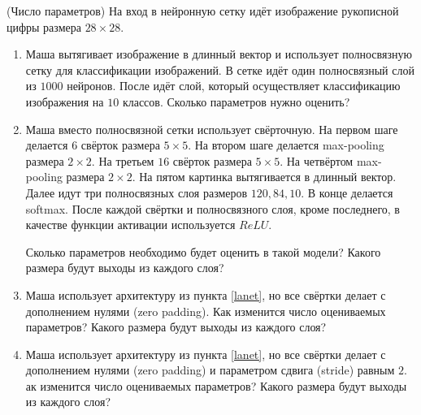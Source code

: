 \begin{problem}{(Число параметров)}
На вход в нейронную сетку идёт изображение рукописной цифры размера $28 \times 28$.
\begin{enumerate}
    \item Маша вытягивает изображение в длинный вектор и использует полносвязную сетку для классификации изображений. В сетке идёт один полносвязный слой из $1000$ нейронов. После идёт слой, который осуществляет классификацию изображения на $10$ классов. Сколько параметров нужно оценить?
    
    \item \label{lanet} Маша вместо полносвязной сетки использует свёрточную. На первом шаге делается $6$ свёрток размера $5 \times 5$. На втором шаге делается max-pooling размера $2 \times 2$. На третьем $16$ свёрток размера $5\times 5$. На четвёртом max-pooling размера $2 \times 2$. На пятом картинка вытягивается в длинный вектор. Далее идут три полносвязных слоя размеров $120, 84, 10$. В конце делается softmax. После каждой свёртки и полносвязного слоя, кроме последнего, в качестве функции активации используется $ReLU.$ 
    
    \begin{center}    
    \end{center} 
    
    Сколько параметров необходимо будет оценить в такой модели? Какого размера будут выходы из каждого слоя? 
    
    \item Маша использует архитектуру из пункта \ref{lanet}, но все свёртки делает с дополнением нулями (zero padding). Как изменится число оцениваемых параметров? Какого размера будут выходы из каждого слоя? 
    
    \item Маша использует архитектуру из пункта \ref{lanet}, но все свёртки делает с дополнением нулями (zero padding) и параметром сдвига (stride) равным $2$. ак изменится число оцениваемых параметров? Какого размера будут выходы из каждого слоя?
\end{enumerate}
\end{problem}

